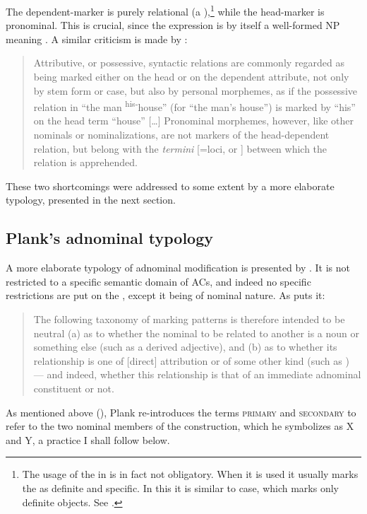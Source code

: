 \largerpage
The dependent-marker is purely relational (a ),\footnote{The usage of the  in  is in fact not obligatory. When it is used it usually marks the \secn as definite and specific. In this it is similar to  \acc* case, which marks only definite objects. See \citet[49f.]{Bozdemir}.}  while the head-marker is pronominal. This is crucial, since the expression  is by itself a well-formed NP meaning . A similar criticism is made by \citet[229]{GoldenbergSemitic}:\blockquote{Attributive, or possessive, syntactic relations are commonly regarded as being marked either on the head or on the dependent attribute, not only by stem form or case, but also by personal morphemes, as if the possessive relation in \enquote{the man \textsuperscript{his-}house} (for \enquote{the man's house}) is marked by \enquote{his} on the head term \enquote{house} [\ldots] Pronominal morphemes, however, like other nominals or nominalizations, are not markers of the head-dependent relation, but belong with the \textit{termini} [=loci, \prim or \secn{}] between which the relation is apprehended.}

These two shortcomings were addressed to some extent by a more elaborate typology, presented in the next section.

\subsection{Plank's adnominal typology} \label{ss:Plank_typology}

A more elaborate typology of adnominal modification is presented by \citet{PlankIntro}. It is not restricted to a specific semantic domain of ACs, and indeed no specific restrictions are put on the \secn, except it being of nominal nature. As \citet[38]{PlankIntro} puts it: \blockquote{The following taxonomy of marking patterns is therefore
intended to be neutral (a) as to whether the nominal to be related to
another is a noun or something else (such as a derived adjective), and (b) as to
whether its relationship is one of [direct] attribution or of some other kind (such as
) --- and indeed, whether this relationship is that of an immediate
adnominal constituent or not.}

As mentioned above (), Plank re-introduces the terms \textsc{primary} and \textsc{secondary} to refer to the two nominal members of the construction, which he symbolizes as X and Y, a practice I shall follow below.

